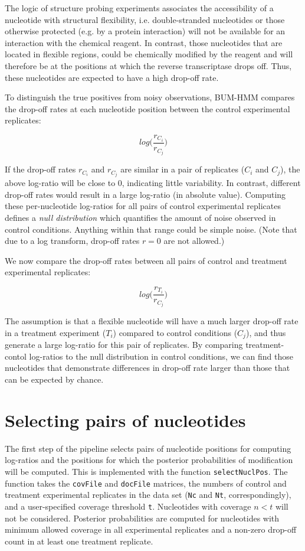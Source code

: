 \documentclass{article}\usepackage[]{graphicx}\usepackage[]{color}
\begin{document}
The logic of structure probing experiments associates the accessibility of a
nucleotide with structural flexibility, i.e. double-stranded nucleotides or
those otherwise protected (e.g. by a protein interaction) will not be available
for an interaction with the chemical reagent. In contrast, those nucleotides
that are located in flexible regions, could be chemically modified by the
reagent and will therefore be at the positions at which the reverse
transcriptase drops off. Thus, these nucleotides are expected to have a high
drop-off rate.

To distinguish the true positives from noisy observations, BUM-HMM compares the
drop-off rates at each nucleotide position between the control experimental
replicates:

\[log \Big( \frac{r_{C_i}}{r_{C_j}} \Big) \]

If the drop-off rates $r_{C_i}$ and $r_{C_j}$ are similar in a pair of
replicates ($C_i$ and $C_j$), the above log-ratio will be close to 0, indicating
little variability. In contrast, different drop-off rates would result in a
large log-ratio (in absolute value). Computing these per-nucleotide log-ratios
for all pairs of control experimental replicates defines a
\textit{null distribution} which quantifies the amount of noise observed in
control conditions. Anything within that range could be simple noise. (Note that
due to a log transform, drop-off rates $r = 0$ are not allowed.)

We now compare the drop-off rates between all pairs of control and treatment
experimental replicates:

\[log \Big( \frac{r_{T_i}}{r_{C_j}} \Big) \]

The assumption is that a flexible nucleotide will have a much larger drop-off
rate in a treatment experiment ($T_i$) compared to control conditions ($C_j$),
and thus generate a large log-ratio for this pair of replicates. By comparing
treatment-contol log-ratios to the null distribution in control conditions, we
can find those nucleotides that demonstrate differences in drop-off rate larger
than those that can be expected by chance.

\section{Selecting pairs of nucleotides}

The first step of the pipeline selects pairs of nucleotide positions for
computing log-ratios and the positions for which the posterior probabilities of
modification will be computed. This is implemented with the function
\texttt{selectNuclPos}. The function takes the \texttt{covFile} and
\texttt{docFile} matrices, the numbers of control and treatment experimental
replicates in the data set (\texttt{Nc} and \texttt{Nt}, correspondingly), and a
user-specified coverage threshold \texttt{t}. Nucleotides with coverage $n < t$
will not be considered. Posterior probabilities are computed for nucleotides
with minimum allowed coverage in all experimental replicates and a non-zero
drop-off count in at least one treatment replicate.
\end{document}
